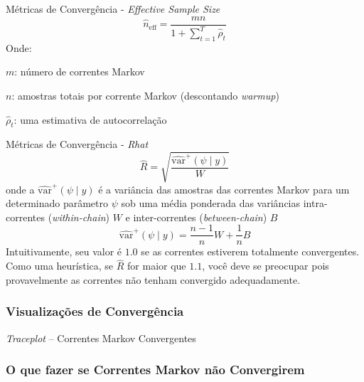 \begin{frame}{Métricas de Convergência - \textit{Effective Sample Size} \parencite{gelman2013bayesian}}
  $$\widehat{n}_{\text{eff}} = \frac{mn}{1 + \sum_{t=1}^T \widehat{\rho}_t}$$
  Onde:
  \begin{vfilleditems}
    \item $m$: número de correntes Markov
    \item $n$: amostras totais por corrente Markov (descontando \textit{warmup})
    \item $\widehat{\rho}_t$: uma estimativa de autocorrelação
  \end{vfilleditems}
\end{frame}

\begin{frame}{Métricas de Convergência - \textit{Rhat} \parencite{gelman2013bayesian}}
  $$\widehat{R} = \sqrt{\frac{\widehat{\text{var}}^+(\psi \mid y)}{W}}$$
  onde a $\widehat{\text{var}}^+(\psi \mid y)$ é a variância das amostras das
  correntes Markov para um determinado parâmetro $\psi$ sob uma média ponderada
  das variâncias intra-correntes (\textit{within-chain}) $W$ e inter-correntes
  (\textit{between-chain}) $B$
  $$\widehat{\text{var}}^+(\psi \mid y) = \frac{n-1}{n} W + \frac{1}{n} B$$
  Intuitivamente, seu valor é $1.0$ se as correntes estiverem totalmente convergentes.
  Como uma heurística, se $\widehat{R}$ for maior que $1.1$, você deve se preocupar pois
  provavelmente as correntes não tenham convergido adequadamente.
\end{frame}

\subsubsection{Visualizações de Convergência}
\begin{frame}{\textit{Traceplot} -- Correntes Markov Convergentes}
  \begin{figure}
    \centering
    \resizebox{.4\linewidth}{!}{}
  \end{figure}
\end{frame}

\subsubsection{O que fazer se Correntes Markov não Convergirem}


